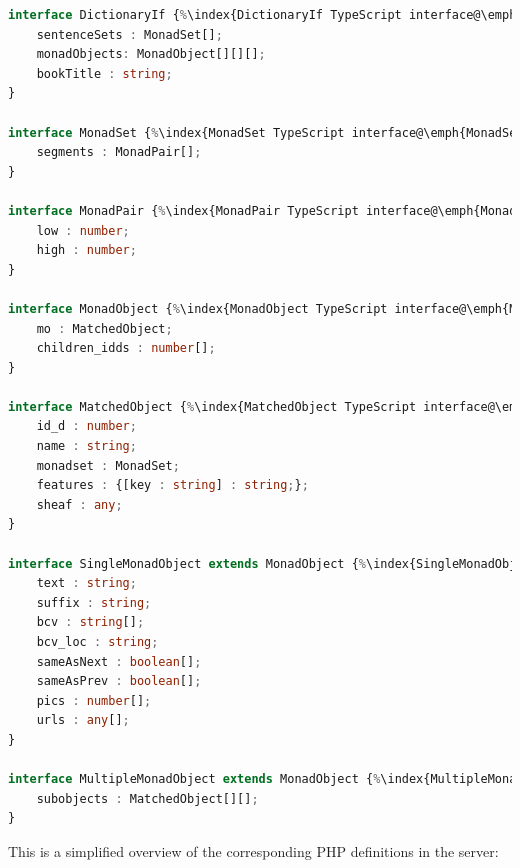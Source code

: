 \documentclass[11pt,oneside,a4paper]{memoir}
\begin{document}
\begin{lstlisting}[language=TypeScript]
interface DictionaryIf {%\index{DictionaryIf TypeScript interface@\emph{DictionaryIf} TypeScript interface}%
    sentenceSets : MonadSet[];
    monadObjects: MonadObject[][][];
    bookTitle : string;
}

interface MonadSet {%\index{MonadSet TypeScript interface@\emph{MonadSet} TypeScript interface}%
    segments : MonadPair[];
}

interface MonadPair {%\index{MonadPair TypeScript interface@\emph{MonadPair} TypeScript interface}%
    low : number;
    high : number;
}

interface MonadObject {%\index{MonadObject TypeScript interface@\emph{MonadObject} TypeScript interface}%
    mo : MatchedObject;
    children_idds : number[];
}

interface MatchedObject {%\index{MatchedObject TypeScript interface@\emph{MatchedObject} TypeScript interface}%
    id_d : number;
    name : string;
    monadset : MonadSet;
    features : {[key : string] : string;};
    sheaf : any;
}

interface SingleMonadObject extends MonadObject {%\index{SingleMonadObject TypeScript interface@\emph{SingleMonadObject} TypeScript interface}%
    text : string;
    suffix : string;
    bcv : string[];
    bcv_loc : string;
    sameAsNext : boolean[];
    sameAsPrev : boolean[];
    pics : number[];
    urls : any[];
}

interface MultipleMonadObject extends MonadObject {%\index{MultipleMonadObject TypeScript interface@\emph{MultipleMonadObject} TypeScript interface}%
    subobjects : MatchedObject[][];
}
\end{lstlisting}

This is a simplified overview of the corresponding PHP definitions in the server:
\end{document}
